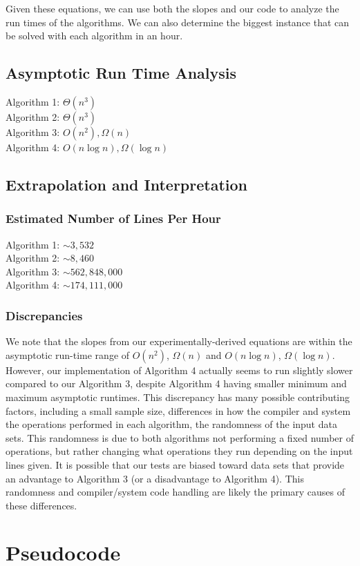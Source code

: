 \documentclass{article}
\begin{document}
Given these equations, we can use both the slopes and our code to analyze the run times of the algorithms. We can also determine the biggest instance that can be solved with each algorithm in an hour.

\subsection*{Asymptotic Run Time Analysis}
Algorithm 1: $\Theta(n^3)$\\
Algorithm 2: $\Theta(n^3)$\\
Algorithm 3: $O(n^2), \Omega(n)$\\
Algorithm 4: $O(n\log n), \Omega(\log n)$\\

\subsection*{Extrapolation and Interpretation}
\subsubsection*{Estimated Number of Lines Per Hour}
Algorithm 1: $\sim 3,532$\\
Algorithm 2: $\sim 8,460$\\
Algorithm 3: $\sim 562,848,000$\\
Algorithm 4: $\sim 174,111,000$

\subsubsection*{Discrepancies}

We note that the slopes from our experimentally-derived equations are within the asymptotic run-time range of $O(n^2)$, $\Omega(n)$ and $O(n\log n)$, $\Omega(\log n)$.  However, our implementation of Algorithm 4 actually seems to run slightly slower compared to our Algorithm 3, despite Algorithm 4 having smaller minimum and maximum asymptotic runtimes.  This discrepancy has many possible contributing factors, including a small sample size, differences in how the compiler and system the operations performed in each algorithm, the randomness of the input data sets.  This randomness is due to both algorithms not performing a fixed number of operations, but rather changing what operations they run depending on the input lines given.  It is possible that our tests are biased toward data sets that provide an advantage to Algorithm 3 (or a disadvantage to Algorithm 4).  This randomness and compiler/system code handling are likely the primary causes of these differences.

\pagebreak

\section*{Pseudocode}

\end{document}
